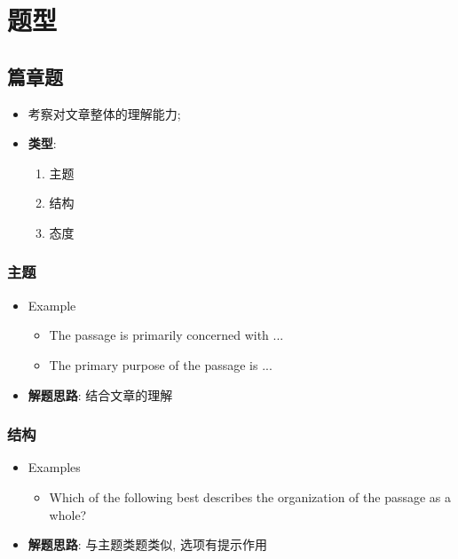 \chapter{题型}

\section{篇章题}

  \begin{itemize}
    \item 考察对文章整体的理解能力;
    \item \textbf{类型}:
    \begin{enumerate}
      \item 主题
      \item 结构
      \item 态度
    \end{enumerate}
  \end{itemize}

  \subsection{主题}

    \begin{itemize}
      \item Example
      \begin{itemize}
        \item The passage is primarily concerned with ...
        \item The primary purpose of the passage is ...
      \end{itemize}

      \item \textbf{解题思路}: 结合文章的理解
    \end{itemize}

  \subsection{结构}

    \begin{itemize}
      \item Examples
      \begin{itemize}
        \item Which of the following best describes the organization of the
        passage as a whole?
      \end{itemize}

      \item \textbf{解题思路}: 与主题类题类似, 选项有提示作用
    \end{itemize}

